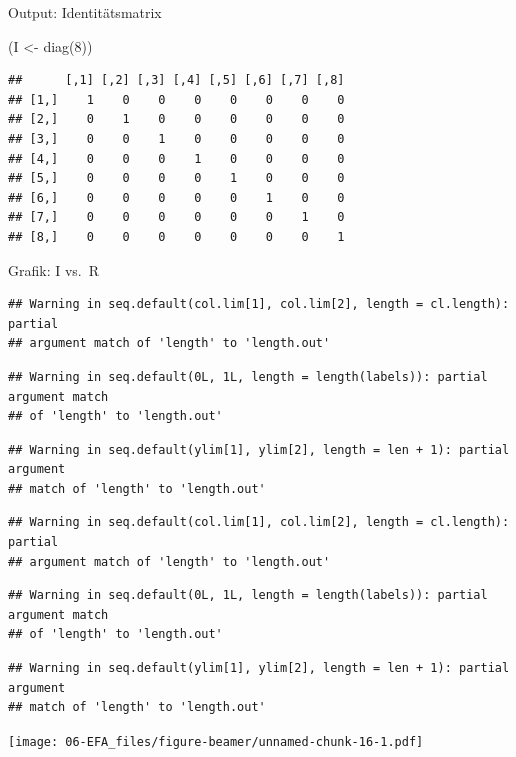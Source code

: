\documentclass[
  ignorenonframetext,
]{beamer}
\newenvironment{Shaded}{\begin{snugshade}}{\end{snugshade}}
\newcommand{\DecValTok}[1]{\textcolor[rgb]{0.00,0.00,0.81}{#1}}
\newcommand{\FunctionTok}[1]{\textcolor[rgb]{0.00,0.00,0.00}{#1}}
\newcommand{\NormalTok}[1]{#1}
\newcommand{\OtherTok}[1]{\textcolor[rgb]{0.56,0.35,0.01}{#1}}
\begin{document}
\begin{frame}[fragile]{Output: Identitätsmatrix}
\protect\hypertarget{output-identituxe4tsmatrix}{}
\begin{Shaded}
\begin{Highlighting}[]
\NormalTok{(I }\OtherTok{\textless{}{-}} \FunctionTok{diag}\NormalTok{(}\DecValTok{8}\NormalTok{))}
\end{Highlighting}
\end{Shaded}

\begin{verbatim}
##      [,1] [,2] [,3] [,4] [,5] [,6] [,7] [,8]
## [1,]    1    0    0    0    0    0    0    0
## [2,]    0    1    0    0    0    0    0    0
## [3,]    0    0    1    0    0    0    0    0
## [4,]    0    0    0    1    0    0    0    0
## [5,]    0    0    0    0    1    0    0    0
## [6,]    0    0    0    0    0    1    0    0
## [7,]    0    0    0    0    0    0    1    0
## [8,]    0    0    0    0    0    0    0    1
\end{verbatim}
\end{frame}

\begin{frame}[fragile]{Grafik: I vs.~R}
\protect\hypertarget{grafik-i-vs.-r}{}
\begin{verbatim}
## Warning in seq.default(col.lim[1], col.lim[2], length = cl.length): partial
## argument match of 'length' to 'length.out'
\end{verbatim}

\begin{verbatim}
## Warning in seq.default(0L, 1L, length = length(labels)): partial argument match
## of 'length' to 'length.out'
\end{verbatim}

\begin{verbatim}
## Warning in seq.default(ylim[1], ylim[2], length = len + 1): partial argument
## match of 'length' to 'length.out'
\end{verbatim}

\begin{verbatim}
## Warning in seq.default(col.lim[1], col.lim[2], length = cl.length): partial
## argument match of 'length' to 'length.out'
\end{verbatim}

\begin{verbatim}
## Warning in seq.default(0L, 1L, length = length(labels)): partial argument match
## of 'length' to 'length.out'
\end{verbatim}

\begin{verbatim}
## Warning in seq.default(ylim[1], ylim[2], length = len + 1): partial argument
## match of 'length' to 'length.out'
\end{verbatim}

\texttt{[image: 06-EFA\_files/figure-beamer/unnamed-chunk-16-1.pdf]}
\end{frame}
\end{document}
